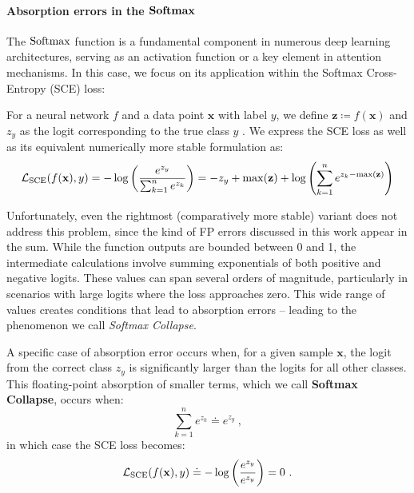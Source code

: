 \paragraph{Absorption errors in the $\mathbf{Softmax}$}
The $\mathrm{Softmax}$ function is a fundamental component in numerous deep learning architectures, serving as an activation function or a key element in attention mechanisms. In this case, we focus on its application within the Softmax Cross-Entropy (SCE) loss:

\begin{dfn}
    For a neural network $f$ and a data point $\textbf{x}$ with label $y$, we define $\textbf{z} \coloneq f(\textbf{x})$ and $z_y$ as the logit corresponding to the true class $y$ . We express the SCE loss as well as its equivalent numerically more stable formulation as:
\begin{equation}
    \mathcal{L}_{\mathrm{SCE}}(f(\textbf{x}), y) = -\log\left(\frac{e^{z_y}}{\sum_{k=1}^n e^{z_k}}\right)= -z_y + \max(\textbf{z}) + \log\left(\sum_{k=1}^n e^{z_k-\max(\textbf{z})}\right)
    \label{eq:log_softmax}
\end{equation}
\end{dfn}

Unfortunately, even the rightmost (comparatively more stable) variant does not address this problem, since the kind of FP errors discussed in this work appear in the sum. While the \softmax function outputs are bounded between 0 and 1, the intermediate calculations involve summing exponentials of both positive and negative logits. These values can span several orders of magnitude, particularly in scenarios with large logits where the loss approaches zero. This wide range of values creates conditions that lead to absorption errors -- leading to the phenomenon we call \textit{Softmax Collapse}.

\begin{dfn}
    A specific case of absorption error occurs when, for a given sample $\textbf{x}$, the logit from the correct class $z_y$ is significantly larger than the logits for all other classes. This floating-point absorption of smaller terms, which we call \textbf{Softmax Collapse}, occurs when:
    \begin{equation}
    \sum_{k=1}^n e^{z_k} \doteq e^{z_y} ~ ,
    \label{eq:softmax_collapse}
    \end{equation}
    in which case the SCE loss becomes:
    \begin{equation}
        \mathcal{L}_{\mathrm{SCE}}(f(\textbf{x}), y) \doteq -\log\left(\frac{e^{z_y}}{e^{z_y}}\right) = 0 ~ .
    \end{equation}
\end{dfn} 

